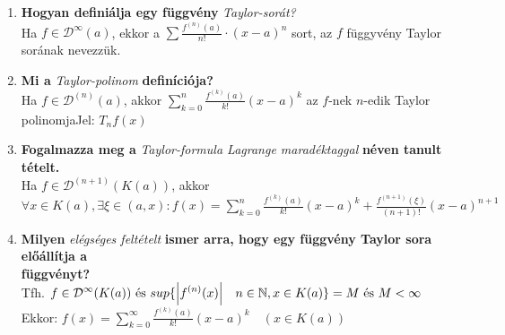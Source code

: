 \documentclass[a4paper,11pt]{article}
\begin{document}
	\def\D{\displaystyle\mathcal{D}}
	\def\N{\mathbb{N}}
	\begin{enumerate}
		\item\textbf{Hogyan definiálja egy függvény}
		\textit{Taylor-sorát?}\\[0.1cm]
		Ha $f\in\D^{\infty}(a)$, ekkor a $\sum\frac{f^{(n)}(a)}{n!} 
		\cdot(x-a)^{n}$ sort, az $f$ függyvény Taylor sorának nevezzük.
		\item\textbf{Mi a} \textit{Taylor-polinom} \textbf{definíciója?}\\[0.1cm]
		Ha $f\in\D^{(n)}(a)$, akkor $\sum\limits_{k=0}^{n} 
		\frac{f^{(k)}(a)}{k!}(x-a)^k$ az $f$-nek $n$-edik Taylor 
		polinomja\hspace{1cm}Jel: $T_nf(x)$
		\item\textbf{Fogalmazza meg a} \textit{Taylor-formula Lagrange maradéktaggal}
		\textbf{néven tanult tételt.}\\[0.1cm]
		Ha $f\in\D^{(n+1)}(K(a))$, akkor\\[0.1cm]$\forall x\in K(a),\exists\xi\in(a,x):
		f(x)=\sum\limits_{k=0}^{n}\frac{f^{(k)}(a)}{k!}(x-a)^k+\frac{f^{(n+1)}(\xi)}{(n+1)!}(x-a)^{n+1}$
		\item\textbf{Milyen} \textit{elégséges feltételt}
		\textbf{ismer arra, hogy egy függvény Taylor sora előállítja a\\függvényt?}
		\\[0.1cm]
		Tfh. $f\in\D^\infty(K(a))\text{ és }sup\{\abs{f^{(n)}(x)}\quad n\in\N,x\in 
		K(a)\}=M\text{ és }M<\infty$\\[0.2cm]Ekkor: $f(x)=\sum\limits_{k=0}^{\infty}\frac
		{f^{(k)}(a)}{k!}(x-a)^k\quad(x\in K(a))$
	\end{enumerate}
\end{document}
